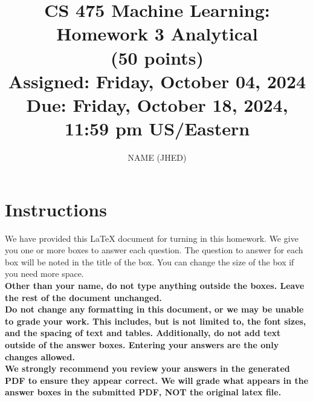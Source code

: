 \documentclass[11pt]{article}
\title{CS 475 Machine Learning: Homework 3 Analytical \\
(50 points)\\
\Large{Assigned: Friday, October 04, 2024} \\
\Large{Due: Friday, October 18, 2024, 11:59 pm US/Eastern}}
\author{NAME (JHED)}
\date{}
\renewcommand{\vec}[1]{\mathbf{#1}}
\begin{document}
\maketitle
\thispagestyle{headings}

\section*{Instructions }
We have provided this \LaTeX{} document for turning in this homework. We give you one or more boxes to answer each question.  The question to answer for each box will be noted in the title of the box.  You can change the size of the box if you need more space.\\

{\bf Other than your name, do not type anything outside the boxes. Leave the rest of the document unchanged.}\\


\textbf{Do not change any formatting in this document, or we may be unable to
  grade your work. This includes, but is not limited to, the font sizes, and the spacing of text and tables.  Additionally, do
  not add text outside of the answer boxes. Entering your answers are the only
  changes allowed.}\\


\textbf{We strongly recommend you review your answers in the generated PDF to
  ensure they appear correct. We will grade what appears in the answer boxes in
  the submitted PDF, NOT the original latex file.}

\end{document}
